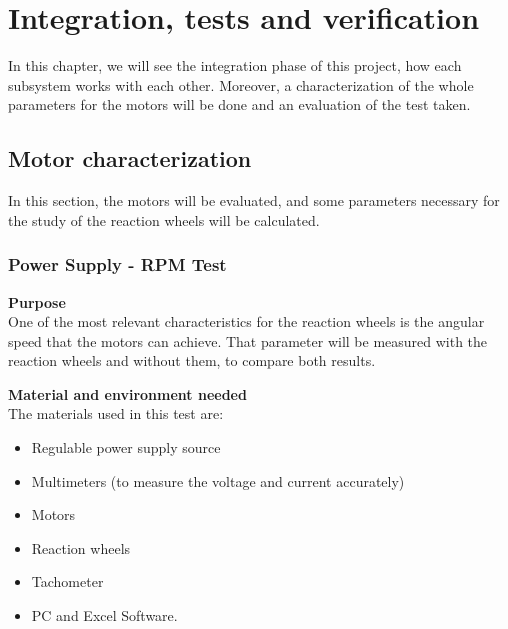 \chapter{Integration, tests and verification}\label{chap:chapter5}

In this chapter, we will see the integration phase of this project, how each subsystem works with each other. Moreover, a characterization of the whole parameters for the motors will be done and an evaluation of the test taken. 

\section{Motor characterization}\label{sec:motorcharacterization}

In this section, the motors will be evaluated, and some parameters necessary for the study of the reaction wheels will be calculated. 

\subsection{Power Supply - RPM Test}\label{ssec:RPM}

\textbf{Purpose} \\


One of the most relevant characteristics for the reaction wheels is the angular speed that the motors can achieve. That parameter will be measured with the reaction wheels and without them, to compare both results.

\textbf{Material and environment needed} \\


The materials used in this test are:
\begin{itemize}
\item Regulable power supply source
\item Multimeters (to measure the voltage and current accurately)
\item Motors
\item Reaction wheels
\item Tachometer
\item \acrshort{PC} and Excel Software.
\end{itemize}

